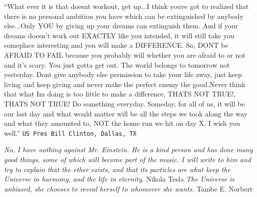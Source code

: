 \par 
\textsf{“What ever it is that doesn\textquotesingle t workout, get up...I think you\textquotesingle ve got to realized that there is no personal ambition you have which can be extinguished by anybody else...Only YOU by giving up your dreams can extinguish them. And if your dreams doesn’t work out EXACTLY like you intended, it will still take you someplace interesting and you will make a DIFFERENCE. So, DON\textquotesingle T be AFRAID TO FAIL because you probably will whether you are afraid to or not and it's scary. You just gotta get out. 
The world belongs to tomorrow not yesterday. Don\textquotesingle t give anybody else permission to take your life away, just keep living and keep giving and never make the perfect enemy the good.Never think that what I\textquotesingle m doing is too little to make a difference, THAT\textquotesingle S NOT TRUE!, THAT\textquotesingle S NOT TRUE!  Do something everyday. Someday, for all of us, it will be our last day and what would matter will be all the steps we took along the way and what they amounted to, NOT the home run we hit on day X. I wish you well.”}
\newline
\texttt{US Pres  Bill Clinton, Dallas, TX}
\par

\textit{No, I have nothing against Mr. Einstein. He is a kind person and has done many good things, some of which will become part of the music. I will write to him and try to explain that the ether exists, and that its particles are what keep the Universe in harmony, and the life in eternity}. 
\newline
Nikola Tesla
\newline
\textit{The Universe is unbiased, she chooses to reveal herself to whomever she wants.}
\newline
Tambe E. Norbert

